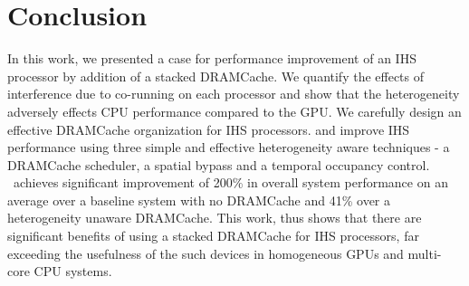 \section{Conclusion} \label{conclusion}
In this work, we presented a case for performance improvement of an IHS processor by addition of a stacked DRAMCache. We quantify the effects of interference due to co-running on each processor and show that the heterogeneity adversely effects CPU performance compared to the GPU. 
We carefully design an effective DRAMCache organization for IHS processors.
and improve IHS performance using three simple and effective heterogeneity aware techniques - a DRAMCache scheduler, a spatial bypass and a temporal occupancy control. \cachename\ achieves significant improvement of 200\% in overall system performance on an average over a baseline system with no DRAMCache and 41\% over a heterogeneity unaware DRAMCache. This work, thus shows that there are significant benefits of using a stacked DRAMCache for IHS processors, far exceeding the usefulness of the such devices in homogeneous GPUs and multi-core CPU systems.